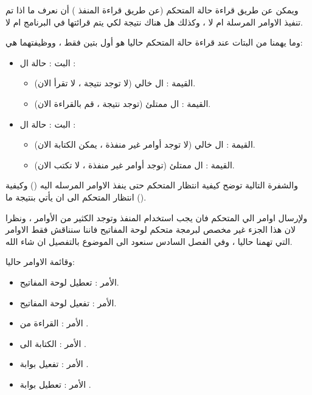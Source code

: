 \documentclass[document.tex]{subfiles}
\begin{document}
ويمكن عن طريق قراءة حالة المتحكم (عن طريق قراءة المنفذ ) أن نعرف ما اذا تم تنفيذ الاوامر المرسلة ام لا ، وكذلك هل هناك نتيجة لكي يتم قرائتها في البرنامج ام لا.

وما يهمنا من البتات عند قراءة حالة المتحكم حاليا هو أول بتين فقط  ، ووظيفتهما هي:

\begin{itemize}
\item البت : حالة ال :
\begin{itemize}
\item القيمة : ال  خالي (لا توجد نتيجة ، لا تقرأ الان).
\item القيمة : ال  ممتلئ (توجد نتيجة ، قم بالقراءة الان).
\end{itemize}

\item البت : حالة ال :
\begin{itemize}
\item القيمة : ال  خالي (لا توجد أوامر غير منفذة ، يمكن الكتابة الان).
\item القيمة : ال  ممتلئ (توجد أوامر غير منفذة ، لا تكتب الان).
\end{itemize}

\end{itemize}

والشفرة التالية توضح كيفية انتظار المتحكم حتى ينفذ الاوامر المرسله اليه () وكيفية انتظار المتحكم الى ان يأتي بنتيجة ما ().

\begin{english}
\lstset{numberstyle=\tiny,numbersep=5pt,tabsize=2,extendedchars=true,breaklines=true,frame=b,showspaces=false, showtabs=false,xleftmargin=10pt,framexleftmargin=10pt,framexrightmargin=5pt,framexbottommargin=4pt,showstringspaces=false,language=[x86masm]Assembler}


\end{english}

ولإرسال اوامر الي المتحكم فان يجب استخدام المنفذ  وتوجد الكثير من الأوامر ، ونظرا لان هذا الجزء غير مخصص لبرمجة متحكم لوحة المفاتيح فاننا سنناقش فقط الاوامر التي تهمنا حاليا ، وفي الفصل السادس سنعود الى الموضوع بالتفصيل ان شاء الله.

وقائمة الاوامر حاليا:
\begin{itemize}
\item الأمر : تعطيل لوحة المفاتيح.
\item الأمر : تفعيل لوحة المفاتيح.
\item الأمر : القراءة من .
\item الأمر : الكتابة الى .
\item الأمر : تفعيل بوابة .
\item الأمر : تعطيل بوابة .

\end{itemize}
\end{document}
